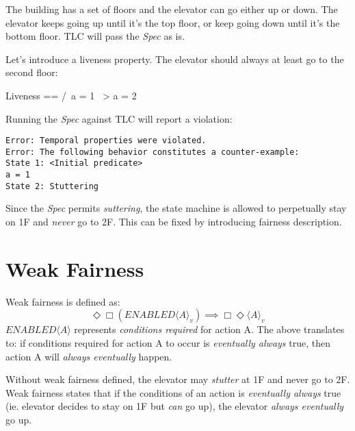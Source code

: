 \documentclass{report}
\begin{document}
The building has a set of floors and the elevator can go either up or down. The
elevator keeps going up until it's the top floor, or keep going down until it's
the bottom floor. TLC will pass the \textit{Spec} as is.\newline

Let's introduce a liveness property. The elevator should always at least go 
to the second floor:\newline
\begin{tla}
Liveness == 
    /\ a = 1 ~> a = 2
\end{tla}
\begin{tlatex}
%
%
\end{tlatex}
\newline

Running the \textit{Spec} against TLC will report a violation:

\begin{verbatim}
Error: Temporal properties were violated.
Error: The following behavior constitutes a counter-example:
State 1: <Initial predicate>
a = 1
State 2: Stuttering
\end{verbatim}

Since the \textit{Spec} permits \textit{suttering}, the state machine is allowed
to perpetually stay on 1F and \textit{never} go to 2F. This can be fixed by
introducing fairness description.

\section{Weak Fairness}

Weak fairness is defined as:\newline
\begin{equation} 
\Diamond\Box(ENABLED\langle A \rangle _v) \implies \Box\Diamond\langle A \rangle _v
\end{equation}
$ENABLED\langle A \rangle$ represents \textit{conditions required} for action A.
The above translates to: if conditions required for action A to occur is
\textit{eventually always} true, then action A will \textit{always eventually}
happen.\newline 

Without weak fairness defined, the elevator may \textit{stutter} at 1F and
never go to 2F. Weak fairness states that if the conditions of an action is
\textit{eventually always} true (ie. elevator decides to stay on 1F but 
\textit{can} go up), the elevator \textit{always eventually} go up.\newline
\end{document}
